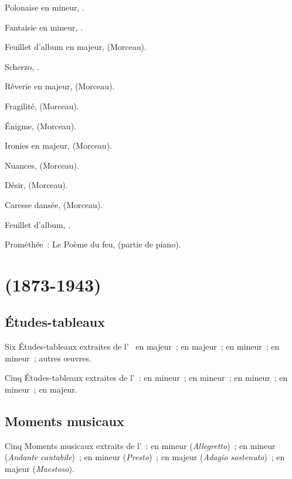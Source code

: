 Polonaise en \kB \Flat mineur, .

Fantaisie en \kB mineur, .

Feuillet d'album en \kE \Flat majeur,   (Morceau).

Scherzo, .

Rêverie en \kC majeur,   (Morceau).

Fragilité,   (Morceau).

Énigme,   (Morceau).

Ironies en \kC majeur,   (Morceau).

Nuances,   (Morceau).

Désir,   (Morceau).

Caresse dansée,   (Morceau).

Feuillet d'album, .

Prométhée~: Le Poème du feu,  (partie de piano).

\section[%
Sergej Rachmaninov (1873-1943)]{%
\SRachmaninov{} (1873-1943)}

\subsection{Études-tableaux}

Six Études-tableaux extraites de l'~  en \kC majeur~;
 en \kE \Flat majeur~;  en \kG mineur~;  en
\kC \Sharp mineur~; autres œuvres.

Cinq Études-tableaux extraites de l'~:  en \kA mineur~;
 en \kB mineur~;  en \kE \Flat mineur~;  en
\kA mineur~;  en \kD majeur.

\subsection{Moments musicaux}

Cinq Moments musicaux extraits de l'~:  en \kE \Flat
mineur (\emph{Allegretto})~;  en \kB mineur (\emph{Andante
cantabile})~;  en \kE mineur (\emph{Presto})~;  en \kD
\Flat majeur (\emph{Adagio sostenuto})~;  en \kC majeur
(\emph{Maestoso}).

